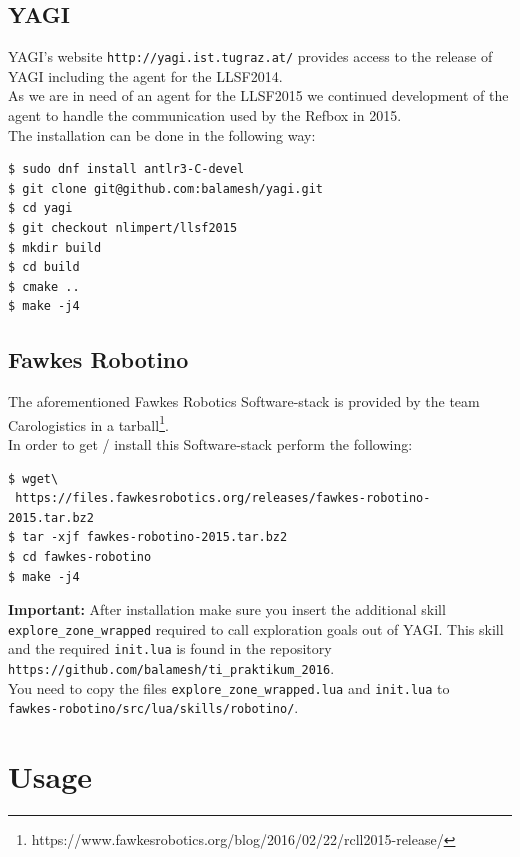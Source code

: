 \documentclass[oribibl]{llncs}
\begin{document}
\subsection{YAGI}
YAGI's website \texttt{http://yagi.ist.tugraz.at/} provides access to the release of YAGI including the agent for the LLSF2014.\\
As we are in need of an agent for the LLSF2015 we continued development of the agent to handle the communication used by the Refbox in 2015.\\
The installation can be done in the following way:
\begin{lstlisting}[frame=single]
$ sudo dnf install antlr3-C-devel
$ git clone git@github.com:balamesh/yagi.git
$ cd yagi
$ git checkout nlimpert/llsf2015
$ mkdir build
$ cd build
$ cmake ..
$ make -j4
\end{lstlisting}

\subsection{Fawkes Robotino}
The aforementioned Fawkes Robotics Software-stack is provided by the team Carologistics in a tarball\footnote{https://www.fawkesrobotics.org/blog/2016/02/22/rcll2015-release/}.\\
In order to get / install this Software-stack perform the following:
\begin{lstlisting}[frame=single]
$ wget\
 https://files.fawkesrobotics.org/releases/fawkes-robotino-2015.tar.bz2
$ tar -xjf fawkes-robotino-2015.tar.bz2
$ cd fawkes-robotino
$ make -j4
\end{lstlisting}
\textbf{Important:} After installation make sure you insert the additional skill \texttt{explore\_zone\_wrapped} required to call exploration goals out of YAGI. This skill and the required \texttt{init.lua} is found in the repository \texttt{https://github.com/balamesh/ti\_praktikum\_2016}.\\
You need to copy the files \texttt{explore\_zone\_wrapped.lua} and \texttt{init.lua} to \\\texttt{fawkes-robotino/src/lua/skills/robotino/}.
\newpage

\section{Usage}
\end{document}
